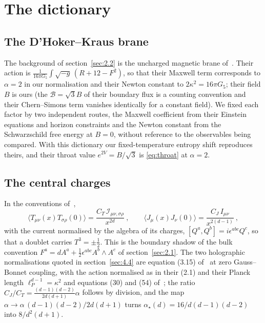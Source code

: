 \section{The dictionary}
\label{app:dictionary}

\subsection{The D'Hoker--Kraus brane}
\label{app:dictionary-brane}

The background of section~\ref{sec:2.2} is the
uncharged magnetic brane of~\cite{DHoker:2009mmn,DHoker:2009ixq}. Their
action is $\frac{1}{16\pi G_5}\int\sqrt{-g}\,(R + 12 - F^2)$, so that their
Maxwell term corresponds to $\alpha = 2$ in our normalisation and their
Newton constant to $2\kappa^2 = 16\pi G_5$; their field $B$ is ours (the
$\mathcal{B} = \sqrt3 B$ of their boundary flux is a counting convention and
their Chern--Simons term vanishes identically for a constant field). We fixed
each factor by two independent routes, the Maxwell coefficient from their
Einstein equations and horizon constraints and the Newton constant from the
Schwarzschild free energy at $B = 0$, without reference to the observables
being compared. With this dictionary our fixed-temperature entropy shift
reproduces theirs, and their throat value $e^{2V} = B/\sqrt3$ is
\eqref{eq:throat} at $\alpha = 2$.

\subsection{The central charges}
\label{app:dictionary-charges}

In the conventions
of~\cite{Osborn:1993cr},
\begin{equation}
\langle T_{\mu\nu}(x)T_{\sigma\rho}(0)\rangle = \frac{C_T\,\mathcal{I}_{\mu\nu,\sigma\rho}}{x^{2d}}~, \qquad
\langle J_\mu(x)J_\nu(0)\rangle = \frac{C_J\,I_{\mu\nu}}{x^{2(d-1)}}~,
\end{equation}
with the current normalised by
the algebra of its charges, $[Q^a, Q^b] = i\epsilon^{abc}Q^c$, so that a doublet carries
$T^3 = \pm\tfrac12$. This is the boundary shadow of the bulk convention
$F^a = dA^a + \tfrac12\epsilon^{abc}A^b\wedge A^c$ of section~\ref{sec:2.1}. The two holographic normalisations quoted in
section~\ref{sec:4.4} are equation (3.15) of~\cite{Buchel:2009sk} at zero
Gauss--Bonnet coupling, with the action normalised as in their (2.1) and
their Planck length $\ell_P^{d-1} = \kappa^2$ and equations (30) and (54)
of~\cite{Freedman:1998tz}; the ratio $C_J/C_T = \tfrac{(d-1)(d-2)}{2d(d+1)}\alpha$
follows by division, and the map $\alpha \to \alpha\,(d-1)(d-2)/2d(d+1)$
turns $\alpha_\star(d) = 16/d(d-1)(d-2)$ into $8/d^2(d+1)$.

